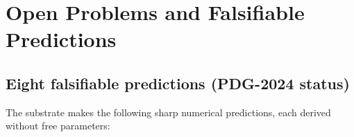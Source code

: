 \documentclass[12pt,a4paper]{amsart}
\theoremstyle{plain}
\theoremstyle{definition}
\theoremstyle{remark}
\begin{document}








\section{Open Problems and Falsifiable Predictions}
\label{sec:open}

\subsection{Eight falsifiable predictions (PDG-2024 status)}
\label{sec:falsifiers}

The substrate makes the following sharp numerical predictions, each
derived without free parameters:
\end{document}
